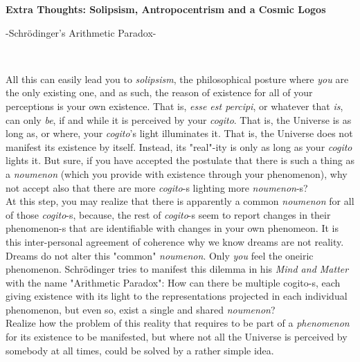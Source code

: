\documentclass[11pt, a4paper]{article} %
\DeclareRobustCommand{\mybox}[2][gray!10]{%
\begin{tcolorbox}[   %
        left=0.2cm,
        right=0.2cm,
        top=0.15cm,
        bottom=0.15cm,
        colback=#1,
        colframe=#1,
        width=\dimexpr\textwidth\relax, 
        enlarge left by=0mm,
        boxsep=5pt,
        arc=0pt,outer arc=0pt,
        ]
        #2
\end{tcolorbox}
}
\begin{document}
\mybox{ {\bf Extra Thoughts: Solipsism, Antropocentrism and a Cosmic Logos \\ \centerline{-Schrödinger's Arithmetic Paradox-} \vspace{-0.2cm}  \\ }
All this can easily lead you to {\em solipsism}, the philosophical posture where {\em you} are the only existing one, and as such, the reason of existence for all of your perceptions is your own existence. That is, {\em esse est percipi}, or whatever that {\em is}, can only {\em be}, if and while it is perceived by your {\em cogito}. That is, the Universe is as long as, or where, your {\em cogito}'s light illuminates it. That is, the Universe does not manifest its existence by itself. Instead, its "real"-ity is only as long as your {\em cogito} lights it. But sure, if you have accepted the postulate that there is such a thing as a {\em noumenon} (which you provide with existence through your phenomenon), why not accept also that there are more {\em cogito}-s lighting more {\em noumenon}-s?\vspace{-0.2cm}  \\

At this step, you may realize that there is apparently a common {\em noumenon} for all of those {\em cogito}-s, because, the rest of {\em cogito}-s seem to report changes in their phenomenon-s that are identifiable with changes in your own phenomeon. It is this inter-personal agreement of coherence why we know dreams are not reality. Dreams do not alter this "common" {\em noumenon}. Only {\em you} feel the oneiric phenomenon. Schrödinger tries to manifest this dilemma in his {\em Mind and Matter} with the name "Arithmetic Paradox": How can there be multiple cogito-s, each giving existence with its light to the representations projected in each individual phenomenon, but even so, exist a single and shared {\em noumenon}?\vspace{-0.2cm} \\

Realize how the problem of this reality that requires to be part of a {\em phenomenon} for its existence to be manifested, but where not all the Universe is perceived by somebody at all times, could be solved by a rather simple idea.}
\end{document}
